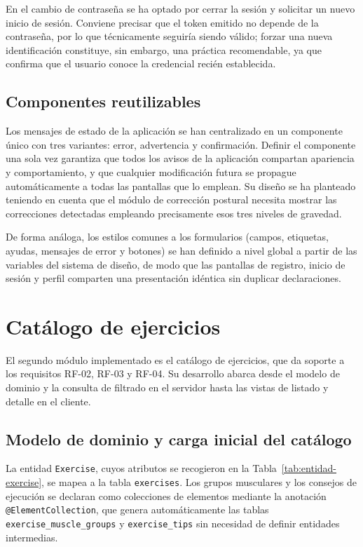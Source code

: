 \documentclass[12pt,a4paper,twoside,openright]{book}
\begin{document}
    En el cambio de contraseña se ha optado por cerrar la sesión y solicitar un
    nuevo inicio de sesión. Conviene precisar que el token emitido no depende de
    la contraseña, por lo que técnicamente seguiría siendo válido; forzar una
    nueva identificación constituye, sin embargo, una práctica recomendable, ya
    que confirma que el usuario conoce la credencial recién establecida.

    \subsection{Componentes reutilizables}

    Los mensajes de estado de la aplicación se han centralizado en un componente
    único con tres variantes: error, advertencia y confirmación. Definir el
    componente una sola vez garantiza que todos los avisos de la aplicación
    compartan apariencia y comportamiento, y que cualquier modificación futura
    se propague automáticamente a todas las pantallas que lo emplean. Su diseño
    se ha planteado teniendo en cuenta que el módulo de corrección postural necesita
    mostrar las correcciones detectadas empleando precisamente esos tres niveles de gravedad.

    De forma análoga, los estilos comunes a los formularios (campos, etiquetas,
    ayudas, mensajes de error y botones) se han definido a nivel global a partir
    de las variables del sistema de diseño, de modo que las pantallas de
    registro, inicio de sesión y perfil comparten una presentación idéntica sin
    duplicar declaraciones.

    \section{Catálogo de ejercicios}

    El segundo módulo implementado es el catálogo de ejercicios, que da soporte
    a los requisitos RF-02, RF-03 y RF-04. Su desarrollo abarca desde el modelo
    de dominio y la consulta de filtrado en el servidor hasta las vistas de
    listado y detalle en el cliente.

    \subsection{Modelo de dominio y carga inicial del catálogo}

    La entidad \texttt{Exercise}, cuyos atributos se recogieron en la
    Tabla~\ref{tab:entidad-exercise}, se mapea a la tabla \texttt{exercises}.
    Los grupos musculares y los consejos de ejecución se declaran como
    colecciones de elementos mediante la anotación
    \texttt{@ElementCollection}, que genera automáticamente las tablas
    \texttt{exercise\_muscle\_groups} y \texttt{exercise\_tips} sin necesidad
    de definir entidades intermedias.
\end{document}
